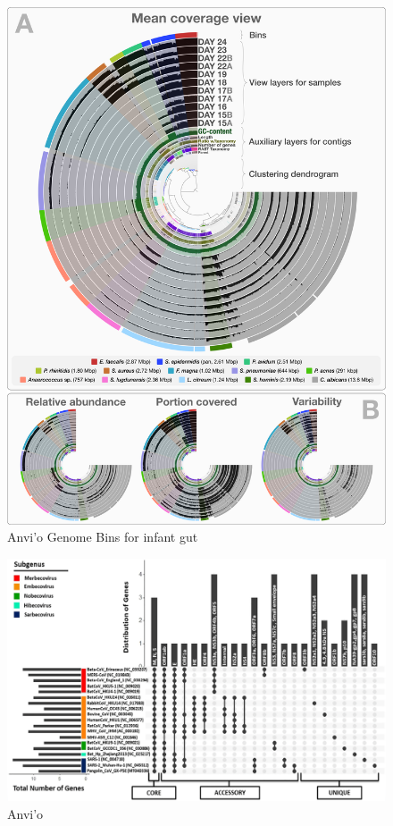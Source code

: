 \documentclass[
]{book}
\begin{document}
\begin{figure}
\centering
\includegraphics[width=1\textwidth,height=\textheight]{./Figures/fig-2-full.png}
\caption{Anvi'o Genome Bins for infant gut}
\end{figure}

\begin{figure}
\centering
\includegraphics[width=1\textwidth,height=\textheight]{./Figures/Anvio.png}
\caption{Anvi'o}
\end{figure}
\end{document}
